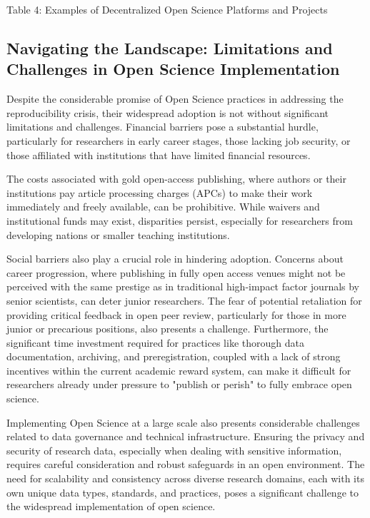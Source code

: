 Table 4: Examples of Decentralized Open Science Platforms and Projects

\subsection{Navigating the Landscape: Limitations and Challenges in Open Science Implementation}

Despite the considerable promise of Open Science practices in addressing the reproducibility crisis, their widespread adoption is not without significant limitations and challenges. Financial barriers pose a substantial hurdle, particularly for researchers in early career stages, those lacking job security, or those affiliated with institutions that have limited financial resources.

The costs associated with gold open-access publishing, where authors or their institutions pay article processing charges (APCs) to make their work immediately and freely available, can be prohibitive. While waivers and institutional funds may exist, disparities persist, especially for researchers from developing nations or smaller teaching institutions.

Social barriers also play a crucial role in hindering adoption. Concerns about career progression, where publishing in fully open access venues might not be perceived with the same prestige as in traditional high-impact factor journals by senior scientists, can deter junior researchers. The fear of potential retaliation for providing critical feedback in open peer review, particularly for those in more junior or precarious positions, also presents a challenge. Furthermore, the significant time investment required for practices like thorough data documentation, archiving, and preregistration, coupled with a lack of strong incentives within the current academic reward system, can make it difficult for researchers already under pressure to "publish or perish" to fully embrace open science.

Implementing Open Science at a large scale also presents considerable challenges related to data governance and technical infrastructure. Ensuring the privacy and security of research data, especially when dealing with sensitive information, requires careful consideration and robust safeguards in an open environment. The need for scalability and consistency across diverse research domains, each with its own unique data types, standards, and practices, poses a significant challenge to the widespread implementation of open science.

